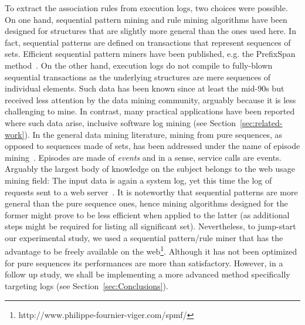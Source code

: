 To extract the association rules from execution logs,
two choices were possible. On one hand, sequential pattern mining and rule mining algorithms
have been designed for structures that are slightly more general than the ones used here.
In fact, sequential patterns are defined on transactions that represent sequences of sets.
Efficient sequential pattern miners have been published, e.g. the PrefixSpan method~\cite{pei2004mining}.
On the other hand, execution logs do not compile to fully-blown sequential transactions as the underlying structures are mere sequences of individual elements. Such data has been known since at least the mid-90s but received less attention by the data mining community, arguably because it is less challenging to mine. In contrast, many practical applications have been reported where such data arise, inclusive software log mining (see Section~\ref{sec:related-work}). In the general data mining literature, mining from pure sequences, as opposed to sequences made of sets, has been addressed under the name of episode mining~\cite{DMKD}. Episodes are made of \textit{events} and in a sense, service calls are events. Arguably the largest body of knowledge on the subject belongs to the web usage mining field: The input data is again a system log, yet this time the log of requests sent to a web server~\cite{pei2000mining}.
It is noteworthy that sequential patterns are more general than the pure sequence ones, hence mining algorithms designed for the former might prove to be less efficient when applied to the latter (as additional steps might be required for listing all significant set).
Nevertheless, to jump-start our experimental study, we used a sequential pattern/rule miner that has the advantage to be freely available on the web\footnote{http://www.philippe-fournier-viger.com/spmf/}. Although it has not been optimized for pure sequences its performances are more than satisfactory. However, in a follow up study, we shall be implementing a more advanced method specifically targeting logs (see Section~\ref{sec:Conclusions}).

